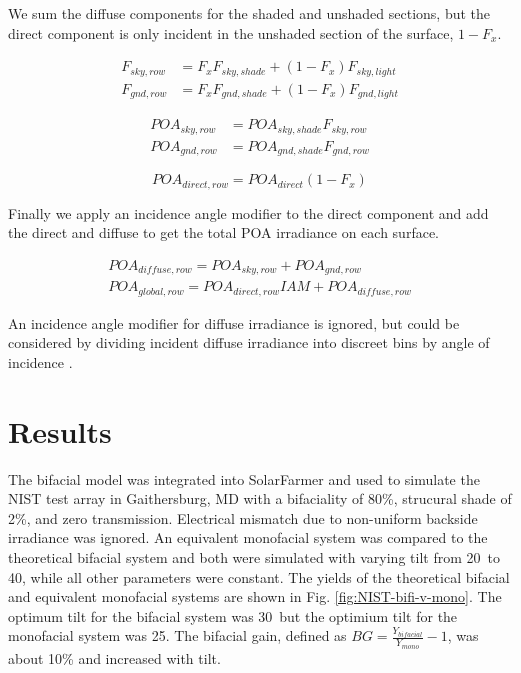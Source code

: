 \documentclass[conference]{IEEEtran}
\begin{document}
We sum the diffuse components for the shaded and unshaded sections, but the direct component is only incident in the unshaded section of the surface, $1-F_x$.

\begin{align}
F_{sky,row} &= F_xF_{sky,shade}+\left(1-F_x\right)F_{sky,light}\\
F_{gnd,row} &= F_xF_{gnd,shade}+\left(1-F_x\right)F_{gnd,light}
\end{align}

\begin{align}
POA_{sky,row} &= POA_{sky,shade}F_{sky,row}\\
POA_{gnd,row} &= POA_{gnd,shade}F_{gnd,row}
\end{align}

\begin{equation}
POA_{direct,row} = POA_{direct}\left(1-F_x\right)
\end{equation}

Finally we apply an incidence angle modifier to the direct component and add the direct and diffuse to get the total POA irradiance on each surface.

\begin{align}
POA_{diffuse,row} = POA_{sky,row} + POA_{gnd,row}\\
POA_{global,row} = POA_{direct,row}IAM + POA_{diffuse,row}
\end{align}

An incidence angle modifier for diffuse irradiance is ignored, but could be considered by dividing incident diffuse irradiance into discreet bins by angle of incidence \cite{Marion2017}.

\section{Results}
The bifacial model was integrated into SolarFarmer \cite{Mikofski_8547323} and used to simulate the NIST test array in Gaithersburg, MD \cite{Boyd2017,Boyd2017a,Boyd2017b} with a bifaciality of 80\%, strucural shade of 2\%, and zero transmission.  Electrical mismatch due to non-uniform backside irradiance was ignored.  An equivalent monofacial system was compared to the theoretical bifacial system and both were simulated with varying tilt from 20\degree\ to 40\degree, while all other parameters were constant.  The yields of the theoretical bifacial and equivalent monofacial systems are shown in Fig. \ref{fig:NIST-bifi-v-mono}.  The optimum tilt for the bifacial system was 30\degree\, but the optimium tilt for the monofacial system was 25\degree.  The bifacial gain, defined as $BG=\frac{Y_{bifacial}}{Y_{mono}}-1$, was about 10\% and increased with tilt.
\end{document}
